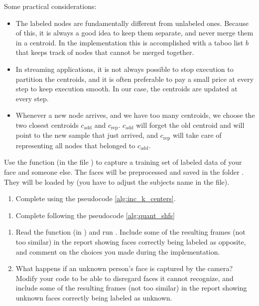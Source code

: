 \documentclass{article}
\begin{document}
Some practical considerations: 
\begin{itemize}
	\item The labeled nodes are fundamentally different from unlabeled ones.
	Because of this, it is always a good idea to keep them separate, and never merge them in a centroid. In the implementation this is accomplished with a taboo list $b$ that keeps track of nodes that cannot be merged together.
	\item In streaming applications, it is not always possible to stop execution to partition the centroids,
	and it is often preferable to pay a small price at every step to keep execution smooth. In our case, the centroids are updated at every step.
	\item Whenever a new node arrives, and we have too many centroids, we choose the two closest centroids $c_{\mathrm{add}}$ and $c_{\mathrm{rep}}$.
	$c_{\mathrm{add}}$ will forget the old centroid and will point to the
	new sample that just arrived, and $c_{\mathrm{rep}}$
	will take care of representing all nodes that belonged to $c_{\mathrm{add}}$.
\end{itemize}


Use the function  (in the file ) to capture
a training set of labeled data of your face and someone else. The faces will be preprocessed and saved in the
folder  . They will be loaded
by  (you have to adjust the subjects
name in the file).


\begin{enumerate}
	\item Complete  using the pseudocode \ref{alg:inc_k_centers}.
\end{enumerate}

\begin{enumerate}[resume]
	\item Complete  following the
	pseudocode \ref{alg:quant_shfs}
\end{enumerate}


\begin{enumerate}[resume]
	\item Read the function  (in ) and run .
	Include some of the resulting frames (not too similar)
	in the report
	showing faces correctly being labeled as opposite,
	and comment on the choices you made during the implementation.
	\item What happens if an unknown person's face is captured by the camera?
	Modify your code to be able to disregard faces it cannot recognize,
	and include some of the resulting frames (not too similar)
	in the report showing unknown faces correctly being labeled as unknown.
\end{enumerate}




\end{document}
